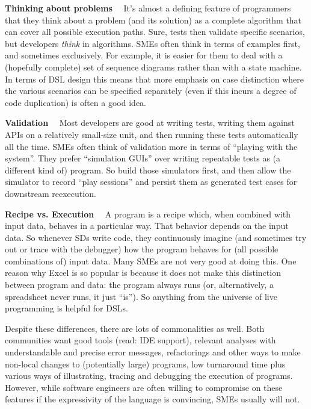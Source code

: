 \documentclass[runningheads]{llncs}
\newcommand\parhead[1]{\vspace{1mm}\noindent\textbf{{#1}}\ \ }
\begin{document}
\parhead{Thinking about problems} It's almost a defining feature of programmers
that they think about a problem (and its solution) as a complete algorithm that
can cover all possible execution paths. Sure, tests then validate specific
scenarios, but developers \emph{think} in algorithms. SMEs often think in terms
of examples first, and sometimes exclusively. For example, it is easier for them
to deal with a (hopefully complete) set of sequence diagrams rather than with a
state machine. In terms of DSL design this means that more emphasis on case
distinction where the various scenarios can be specified separately (even if
this incurs a degree of code duplication) is often a good idea. 

\parhead{Validation} Most developers are good at writing tests, writing
them against APIs on a relatively small-size unit, and then running these
tests automatically all the time. SMEs often think of validation more in
terms of ``playing with the system''. They prefer ``simulation GUIs'' over
writing repeatable tests as (a different kind of) program. So build those
simulators first, and then allow the simulator to record ``play sessions''
and persist them as generated test cases for downstream reexecution.

\parhead{Recipe vs. Execution} A program is a recipe which, when combined
with input data, behaves in a particular way. That behavior depends on the
input data. So whenever SDs write code, they continuously imagine (and sometimes
try out or trace with the debugger) how the program behaves for (all possible
combinations of) input data. Many SMEs are not very good at doing
this. One reason why Excel is so popular is because it does not make this
distinction between program and data: the program always runs (or, alternatively,
a spreadsheet never runs, it just ``is''). So anything from the universe of
live programming is helpful for DSLs.

\vspace{3mm}
\noindent Despite these differences, there are lots of commonalities as well.
Both communities want good tools (read: IDE support), relevant analyses with
understandable and precise error messages, refactorings and other ways to make
non-local changes to (potentially large) programs, low turnaround time plus
various ways of illustrating, tracing and debugging the execution of programs.  
However, while software engineers are often willing to compromise on these
features if the expressivity of the language is convincing, SMEs usually will 
not.
\end{document}
